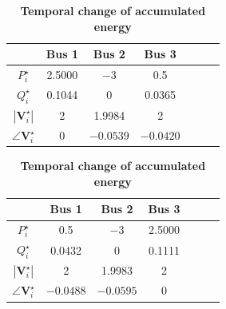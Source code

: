 \documentclass[graybox, envcountchap]{svmult}
\begin{document}
\begin{table}[h]
\medskip
\caption{\textbf{Temporal change of accumulated energy}} \label{table:pflownl}
 \centering
  {
  \begin{minipage}{0.49\linewidth}
    \centering
  \begin{tabular}{|c|c|c|c|c|c|c|}
   \hline
 &  Bus 1 & Bus 2 & Bus 3 \\
   \hline 
   $P_i^{\star}$ & 2.5000 & $-3$ & 0.5 \\
   \hline
   $Q_i^{\star}$ & 0.1044 & 0 & 0.0365 \\
   \hline
   $|\bm{V}_i^{\star}|$ & 2 & 1.9984 & 2 \\
   \hline
   $\angle \bm{V}_i^{\star}$ & 0 & $-0.0539$ & $-0.0420$ \\
   \hline
  \end{tabular}
  \end{minipage}
  \begin{minipage}{0.49\linewidth}
    \centering
  \begin{tabular}{|c|c|c|c|c|c|c|}
   \hline
 &  Bus 1 & Bus 2 & Bus 3 \\
   \hline 
   $P_i^{\star}$ & 0.5 & $-3$ & 2.5000 \\
   \hline
   $Q_i^{\star}$ & 0.0432 & 0 & 0.1111 \\
   \hline
   $|\bm{V}_i^{\star}|$ & 2 & 1.9983 & 2 \\
   \hline
   $\angle \bm{V}_i^{\star}$ & $-0.0488$ & $-0.0595$ & 0 \\
   \hline
  \end{tabular}
  \end{minipage}
  }
\end{table}
\end{document}
